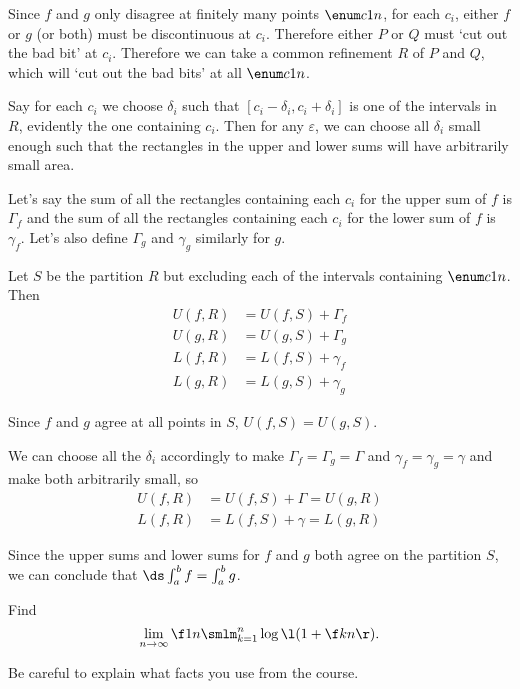 \documentclass[a4paper]{article}
\begin{document}
Since $f$ and $g$ only disagree at finitely many points $\enum c1n$, for each $c_i$, either $f$ or $g$ (or both) must be discontinuous at $c_i$. Therefore either $P$ or $Q$ must \enquote*{cut out the bad bit} at $c_i$. Therefore we can take a common refinement $R$ of $P$ and $Q$, which will \enquote*{cut out the bad bits} at all $\enum c1n$.

Say for each $c_i$ we choose $\delta_i$ such that $[c_i - \delta_i, c_i + \delta_i]$ is one of the intervals in $R$, evidently the one containing $c_i$. Then for any $\varepsilon$, we can choose all $\delta_i$ small enough such that the rectangles in the upper and lower sums will have arbitrarily small area.

Let's say the sum of all the rectangles containing each $c_i$ for the upper sum of $f$ is $\Gamma_f$ and the sum of all the rectangles containing each $c_i$ for the lower sum of $f$ is $\gamma_f$. Let's also define $\Gamma_g$ and $\gamma_g$ similarly for $g$.

Let $S$ be the partition $R$ but excluding each of the intervals containing $\enum c1n$. Then \begin{align*}
U(f, R) &= U(f, S) + \Gamma_f \\
U(g, R) &= U(g, S) + \Gamma_g \\
L(f, R) &= L(f, S) + \gamma_f \\
L(g, R) &= L(g, S) + \gamma_g
\end{align*}

Since $f$ and $g$ agree at all points in $S$, $U(f, S) = U(g, S)$.

We can choose all the $\delta_i$ accordingly to make $\Gamma_f = \Gamma_g = \Gamma$ and $\gamma_f = \gamma_g = \gamma$ and make both arbitrarily small, so \begin{align*}
U(f, R) &= U(f, S) + \Gamma = U(g, R) \\
L(f, R) &= L(f, S) + \gamma = L(g, R)
\end{align*}

Since the upper sums and lower sums for $f$ and $g$ both agree on the partition $S$, we can conclude that $\ds \int_a^b f = \int_a^b g$.



\begin{questionbody}
Find \[
\lim_{n \to \infty} \f1n \smlm_{k=1}^n \log \l( 1 + \f kn \r).
\]

Be careful to explain what facts you use from the course.
\end{questionbody}
\end{document}
